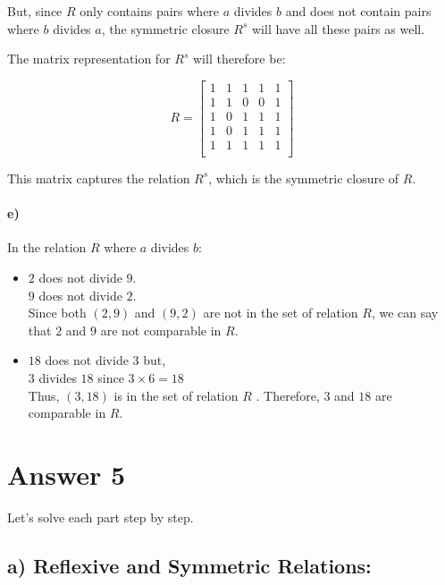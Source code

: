 \documentclass[12pt]{article}
\begin{document}
But, since \( R \) only contains pairs where \( a \) divides \( b \) and does not contain pairs where \( b \) divides \( a \), the symmetric closure \( R^s \) will have all these pairs as well.

The matrix representation for \( R^s \) will therefore be:

\[
R = \begin{bmatrix}
1 & 1 & 1 & 1 & 1 \\
1 & 1 & 0 & 0 & 1 \\
1 & 0 & 1 & 1 & 1 \\
1 & 0 & 1 & 1 & 1 \\
1 & 1 & 1 & 1 & 1 \\
\end{bmatrix}
\]

This matrix captures the relation \( R^s \), which is the symmetric closure of \( R \).

\paragraph{e)}


In the relation \( R \) where \( a \) divides \( b \):

\begin{itemize}
    \item \( 2 \) does not divide \( 9 \). \\
    \( 9 \) does not divide \( 2 \). \\
    Since both \( (2,9) \) and \( (9,2) \) are not in the set of relation \( R \), we can say that \( 2 \) and \( 9 \) are not comparable in \( R \).
    \item \( 18 \) does not divide \( 3 \) but,\\
    \( 3 \) divides \( 18 \) since \( 3 \times 6 = 18 \)\\
    Thus, \( (3,18) \) is in the set of relation \( R \) . Therefore, \( 3 \) and \( 18 \) are comparable in \( R \).
\end{itemize}


\section*{Answer 5}


Let's solve each part step by step.

\subsection*{a) Reflexive and Symmetric Relations:}
\end{document}

